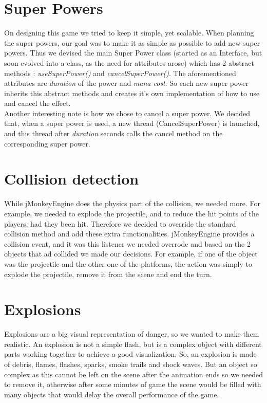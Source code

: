 \documentclass[11pt,a4paper]{report}
\begin{document}
\chapter{Super Powers}

On designing this game we tried to keep it simple, yet scalable. When planning the super powers, our goal was to make it as simple as possible to add new super powers. Thus we devised the main Super Power class (started as an Interface, but soon evolved into a class, as the need for attributes arose) which has 2 abstract methods : \textit{useSuperPower()} and \textit{cancelSuperPower()}. The aforementioned attributes are \textit{duration} of the power and \textit{mana cost}. So each new super power inherits this abstract methods and creates it's own implementation of how to use and cancel the effect. \\

Another interesting note is how we chose to cancel a super power. We decided that, when a super power is used, a new thread (CancelSuperPower) is launched, and this thread after \textit{duration} seconds calls the cancel method on the corresponding super power.

\chapter{Collision detection}

While jMonkeyEngine does the physics part of the collision, we needed more. For example, we needed to explode the projectile, and to reduce the hit points of the players, had they been hit. Therefore we decided to override the standard collision method and add these extra functionalities. jMonkeyEngine provides a collision event, and it was this listener we needed overrode and based on the 2 objects that ad collided we made our decisions. For example, if one of the object was the projectile and the other one of the platforms, the action was simply to explode the projectile, remove it from the scene and end the turn. 

\chapter{Explosions}

Explosions are a big visual representation of danger, so we wanted to make them realistic. An explosion is not a simple flash, but is a complex object with different parts working together to achieve a good visualization.
So, an explosion is made of debris, flames, flashes, sparks, smoke trails and shock waves. But an object so complex as this cannot be left on the scene after the animation ends so we needed to remove it, otherwise after some minutes of game the scene would be filled with many objects that would delay the overall performance of the game. \\
\end{document}
